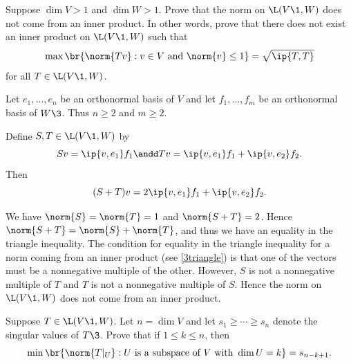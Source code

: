 \exercise
Suppose $\dim V > 1$ and $\dim W > 1$. Prove that the norm on $\L(V\1, W)$ does not come from an inner product. In other words, prove that there does not exist an inner product on $\L(V\1, W)$ such that \label{6notinner}
\[
\max \br{ \norm{Tv} : v \in V \text{ and } \norm{v} \le 1} = \sqrt{\ip{T, T}}
\]
for all $T \in \L(V\1, W)$.

\begin{Solution}
Let $e_1, \ldots, e_n$ be an orthonormal basis of $V$ and let $f_1, \ldots, f_m$ be an orthonormal basis of $W\3$. Thus $n \ge 2$ and $m \ge 2$.

Define $S, T \in \L(V\1, W)$ by
\[
Sv = \ip{v, e_1} f_1 \andd Tv = \ip{v,e_1} f_1 + \ip{v, e_2} f_2.
\]
Then
\[
(S+T)v = 2\ip{v,e_1} f_1 + \ip{v, e_2} f_2.
\]

We have $\norm{S} = \norm{T} = 1$ and $\norm{S+T} = 2$. Hence $\norm{S+T} = \norm{S} + \norm{T}$, and thus we have an equality in the triangle inequality. The condition for equality in the triangle inequality for a norm coming from an inner product (see \ref{3triangle}) is that one of the vectors must be a nonnegative multiple of the other. However, $S$ is not a nonnegative multiple of $T$ and $T$ is not a nonnegative multiple of $S$. Hence the norm on $\L(V\1,W)$ does not come from an inner product.
\end{Solution}

\exercise
Suppose $T \in \L(V\1, W)$. Let $n = \dim V$ and let $s_1 \ge \cdots \ge s_n$ denote the singular values of $T\3$. Prove that if $1 \le k \le n$, then \label{7approx}
\[
\min \br{ \norm{T|_U} : U \text { is a subspace of } V \text{ with } \dim U = k} = s_{n-k+1}.
\]
\exercisedisplayend

